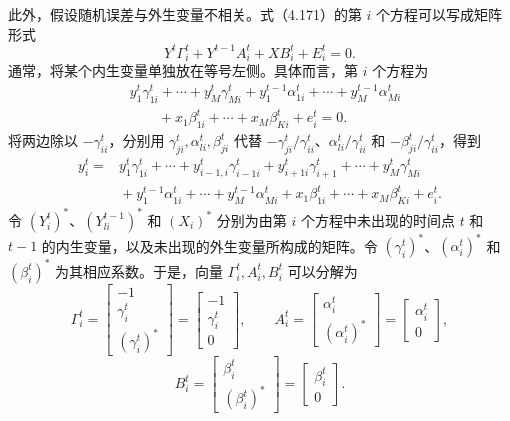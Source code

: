 此外，假设随机误差与外生变量不相关。式（4.171）的第 $i$ 个方程可以写成矩阵形式
\begin{equation}
Y^t\Gamma_i^t+Y^{t-1}A_i^t+XB_i^t+E_i^t=0.\tag{4.185}
\end{equation}
通常，将某个内生变量单独放在等号左侧。具体而言，第 $i$ 个方程为
\begin{equation}
\begin{aligned}
&y_1^t\gamma_{1i}^t+\cdots+y_M^t\gamma_{Mi}^t
 +y_1^{t-1}\alpha_{1i}^t+\cdots+y_M^{t-1}\alpha_{Mi}^t\\
&\qquad+x_1\beta_{1i}^t+\cdots+x_M\beta_{Ki}^t+e_i^t=0.
\end{aligned}\tag{4.186}
\end{equation}
将两边除以 $-\gamma_{ii}^t$，分别用 $\gamma_{ji}^t,\alpha_{li}^t,\beta_{ji}^t$ 代替 $-\gamma_{ji}^t/\gamma_{ii}^t$、$\alpha_{li}^t/\gamma_{ii}^t$ 和 $-\beta_{ji}^t/\gamma_{ii}^t$，得到
\begin{equation}
\begin{aligned}
y_i^t={}&y_1^t\gamma_{1i}^t+\cdots
 +y_{i-1,i}^t\gamma_{i-1i}^t+y_{i+1i}^t\gamma_{i+1}^t
 +\cdots+y_M^t\gamma_{Mi}^t\\
&{}+y_1^{t-1}\alpha_{1i}^t+\cdots+y_M^{t-1}\alpha_{Mi}^t
 +x_1\beta_{1i}^t+\cdots+x_M\beta_{Ki}^t+e_i^t.
\end{aligned}\tag{4.187}
\end{equation}
令 $(Y_i^t)^*$、$(Y_{li}^{t-1})^*$ 和 $(X_i)^*$ 分别为由第 $i$ 个方程中未出现的时间点 $t$ 和 $t-1$ 的内生变量，以及未出现的外生变量所构成的矩阵。令 $(\gamma_i^t)^*$、$(\alpha_i^t)^*$ 和 $(\beta_i^t)^*$ 为其相应系数。于是，向量 $\Gamma_i^t,A_i^t,B_i^t$ 可以分解为
\[
\Gamma_i^t=\begin{bmatrix}-1\\\gamma_i^t\\(\gamma_i^t)^*\end{bmatrix}
 =\begin{bmatrix}-1\\\gamma_i^t\\0\end{bmatrix},
\qquad
A_i^t=\begin{bmatrix}\alpha_i^t\\(\alpha_i^t)^*\end{bmatrix}
 =\begin{bmatrix}\alpha_i^t\\0\end{bmatrix},
\]
\[
B_i^t=\begin{bmatrix}\beta_i^t\\(\beta_i^t)^*\end{bmatrix}
 =\begin{bmatrix}\beta_i^t\\0\end{bmatrix}.
\]
